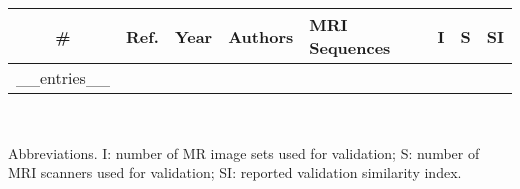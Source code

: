 \newcommand{\citefortable}[1]{%
  \stepcounter{papercount}{\thepapercount}&{\cite{#1}}&{\citeyear{#1}}&{\citeauthor{#1}}}
\begin{tabular}{cccllccc}
  \hline
  \# & Ref. & Year & Authors & MRI Sequences & I & S & SI \\
  \hline
__entries__
  \hline
\end{tabular}\\[0.5em]
\raggedright{\footnotesize{Abbreviations.
I: number of MR image sets used for validation;
S: number of MRI scanners used for validation;
SI: reported validation similarity index.}}
